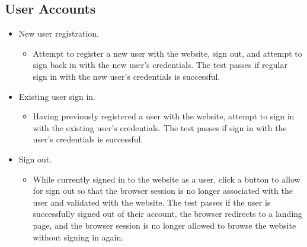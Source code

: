\subsection{User Accounts}
\begin{itemize}
    \item New user registration.
    \begin{itemize}
        \item Attempt to register a new user with the website, sign out, and attempt to sign back in with the new user's credentials.  The test passes if regular sign in with the new user's credentials is successful.
    \end{itemize}

    \item Existing user sign in.
    \begin{itemize}
        \item Having previously registered a user with the website, attempt to sign in with the existing user's credentials. The test passes if sign in with the user's credentials is successful.
    \end{itemize}

    \item Sign out.
    \begin{itemize}
        \item While currently signed in to the website as a user, click a button to allow for sign out so that the browser session is no longer associated with the user and validated with the website.  The test passes if the user is successfully signed out of their account, the browser redirects to a landing page, and the browser session is no longer allowed to browse the website without signing in again.
    \end{itemize}
\end{itemize}



